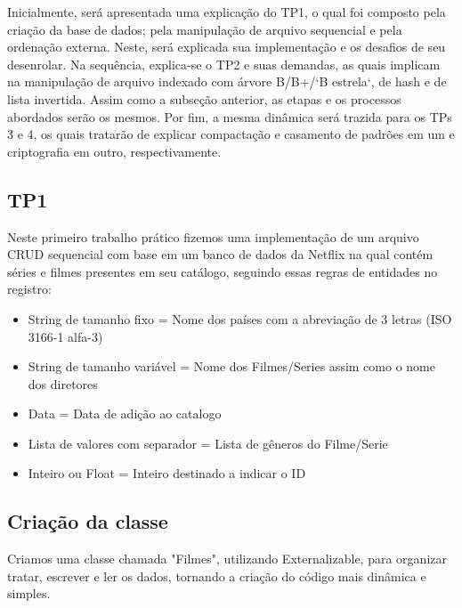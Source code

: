 \documentclass[12pt]{article}
\begin{document}
Inicialmente, será apresentada uma explicação do TP1, o qual foi composto pela criação da base de dados;  pela manipulação de arquivo sequencial e pela ordenação externa. Neste, será explicada sua implementação e os desafios de seu desenrolar. Na sequência, explica-se o TP2 e suas demandas, as quais implicam na manipulação de arquivo indexado com árvore B/B+/`B estrela`, de hash e de lista invertida. Assim como a subseção anterior, as etapas e os processos abordados serão os mesmos. Por fim, a mesma dinâmica será trazida para os TPs 3 e 4, os quais tratarão de explicar compactação e casamento de padrões em um e criptografia em outro, respectivamente.

\subsection{TP1}
Neste primeiro trabalho prático fizemos uma implementação de um arquivo CRUD sequencial com base em um banco de dados da Netflix na qual contém séries e filmes presentes em seu catálogo, seguindo essas regras de entidades no registro:

\begin{itemize}
  \item String de tamanho fixo = Nome dos países com a abreviação de 3 letras (ISO 3166-1 alfa-3)
  \item String de tamanho variável =  Nome dos Filmes/Series assim como o nome dos diretores
  \item Data = Data de adição ao catalogo
  \item Lista de valores com separador = Lista de gêneros do Filme/Serie
  \item Inteiro ou Float = Inteiro destinado a indicar o ID
\end{itemize}

\subsection{Criação da classe}
Criamos uma classe chamada "Filmes", utilizando Externalizable, para organizar tratar, escrever e ler os dados, tornando a criação do código mais dinâmica e simples.
\end{document}
